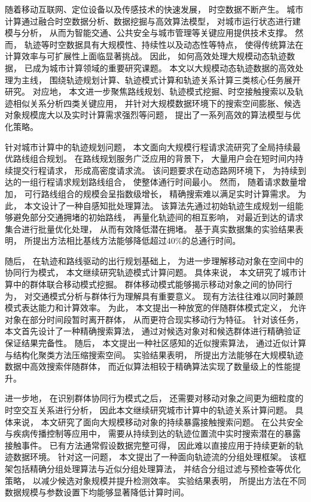 \zhabstract

随着移动互联网、定位设备以及传感技术的快速发展， 时空数据不断产生。 城市计算通过融合时空数据分析、数据挖掘与高效算法模型， 对城市运行状态进行建模与分析， 从而为智能交通、公共安全与城市管理等关键应用提供技术支撑。 然而， 轨迹等时空数据具有大规模性、持续性以及动态性等特点， 使得传统算法在计算效率与可扩展性上面临显著挑战。 因此， 如何高效处理大规模动态轨迹数据， 已成为城市计算领域的重要研究课题。 本文以大规模动态轨迹数据的高效处理为主线， 围绕轨迹规划计算、轨迹模式计算和轨迹关系计算三类核心任务展开研究。 对应地， 本文进一步聚焦路线规划、轨迹模式挖掘、时空接触搜索以及轨迹相似关系分析四类关键应用， 并针对大规模数据环境下的搜索空间膨胀、候选对象规模庞大以及实时计算需求强烈等问题， 提出了一系列高效的算法模型与优化策略。

针对城市计算中的轨迹规划问题， 本文面向大规模行程请求流研究了全局持续最优路线组合规划。 在路线规划服务广泛应用的背景下， 大量用户会在短时间内持续提交行程请求， 形成高密度请求流。 该问题要求在动态路网环境下， 为持续到达的一组行程请求规划路线组合， 使整体通行时间最小。 然而， 随着请求数量增加， 可行路线组合的规模会呈指数级增长， 精确搜索难以满足实时计算需求。 为此， 本文设计了一种自感知批处理算法。 该算法先通过初始轨迹生成规划一组能够避免部分交通拥堵的初始路线， 再量化轨迹间的相互影响， 对最近到达的请求集合进行批量优化处理， 从而有效降低潜在拥堵。 基于真实数据集的实验结果表明， 所提出方法相比基线方法能够降低超过40\%的总通行时间。

随后， 在轨迹和路线驱动的出行规划基础上， 为进一步理解移动对象在空间中的协同行为模式， 本文继续研究轨迹模式计算问题。 具体来说， 本文研究了城市计算中的群体联合移动模式挖掘。 群体移动模式能够揭示移动对象之间的协同行为， 对交通模式分析与群体行为理解具有重要意义。 现有方法往往难以同时兼顾模式表达能力和计算效率。 为此， 本文提出一种放宽的伴随群体模式定义， 允许对象在部分时间段暂时离开群体， 从而更符合现实移动行为特征。 针对该任务， 本文首先设计了一种精确搜索算法， 通过对候选对象对和候选群体进行精确验证保证结果完备性。 随后， 本文提出一种社区感知的近似搜索算法， 通过近似计算与结构化聚类方法压缩搜索空间。 实验结果表明， 所提出方法能够在大规模轨迹数据中高效搜索伴随群体， 而近似算法相较于精确算法实现了数量级上的性能提升。

进一步地， 在识别群体协同行为模式之后， 还需要对移动对象之间更为细粒度的时空交互关系进行分析， 因此本文继续研究城市计算中的轨迹关系计算问题。 具体来说， 本文研究了面向大规模移动对象的持续暴露接触搜索问题。 在公共安全与疾病传播控制等应用中， 需要从持续到达的轨迹位置流中实时搜索潜在的暴露接触事件。 已有方法通常假设数据完整可得， 因此难以直接应用于持续更新的轨迹数据环境。 针对这一问题， 本文提出了一种面向轨迹流的分组处理框架。 该框架包括精确分组处理算法与近似分组处理算法， 并结合分组过滤与预检查等优化策略， 以减少候选对象规模并提升检测效率。 实验结果表明， 所提出方法在不同数据规模与参数设置下均能够显著降低计算时间。

